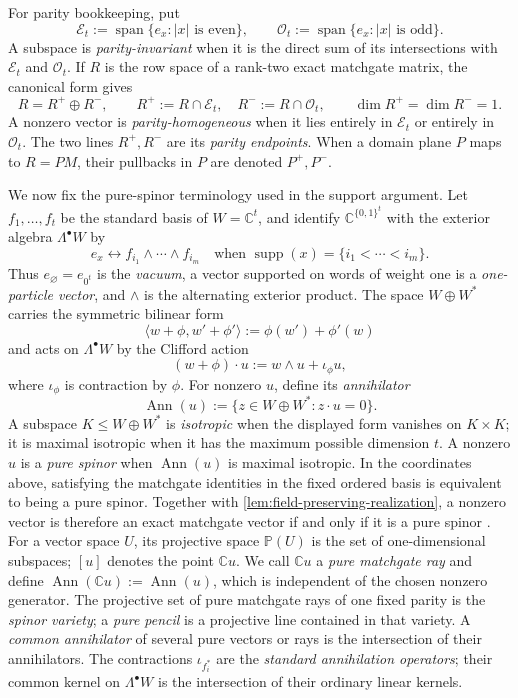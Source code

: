 \documentclass[11pt]{article}
\theoremstyle{definition}
\theoremstyle{remark}
\newcommand{\C}{\mathbb C}
\newcommand{\bits}{\{0,1\}}
\newcommand{\supp}{\operatorname{supp}}
\newcommand{\Ann}{\operatorname{Ann}}
\newcommand{\Span}{\operatorname{span}}
\begin{document}
For parity bookkeeping, put
\[
  \mathcal E_t:=\Span\{e_x:|x|\text{ is even}\},\qquad
  \mathcal O_t:=\Span\{e_x:|x|\text{ is odd}\}.
\]
A subspace is \emph{parity-invariant} when it is the direct sum of its
intersections with $\mathcal E_t$ and $\mathcal O_t$.  If $R$ is the row
space of a rank-two exact matchgate matrix, the canonical form gives
\[
  R=R^+\oplus R^-,\qquad
  R^+:=R\cap\mathcal E_t,\quad R^-:=R\cap\mathcal O_t,\qquad
  \dim R^+=\dim R^-=1.
\]
A nonzero vector is \emph{parity-homogeneous} when it lies entirely in
$\mathcal E_t$ or entirely in $\mathcal O_t$.
The two lines $R^+,R^-$ are its \emph{parity endpoints}.  When a domain
plane $P$ maps to $R=PM$, their pullbacks in $P$ are denoted $P^+,P^-$.

We now fix the pure-spinor terminology used in the support argument.  Let
$f_1,\ldots,f_t$ be the standard basis of $W=\C^t$, and identify
$\C^{\bits^t}$ with the exterior algebra $\Lambda^\bullet W$ by
\[
  e_x\longleftrightarrow
  f_{i_1}\wedge\cdots\wedge f_{i_m}
  \quad\text{when }\supp(x)=\{i_1<\cdots<i_m\}.
\]
Thus $e_\varnothing=e_{0^t}$ is the \emph{vacuum}, a vector supported on
words of weight one is a \emph{one-particle vector}, and $\wedge$ is the
alternating exterior product.  The space $W\oplus W^*$ carries the
symmetric bilinear form
\[
  \langle w+\phi,w'+\phi'\rangle
  :=\phi(w')+\phi'(w)
\]
and acts on $\Lambda^\bullet W$ by the Clifford action
\[
  (w+\phi)\cdot u:=w\wedge u+\iota_\phi u,
\]
where $\iota_\phi$ is contraction by $\phi$.  For nonzero $u$, define its
\emph{annihilator}
\begin{equation}
  \Ann(u):=\{z\in W\oplus W^*:z\cdot u=0\}.
  \label{eq:pure-spinor-annihilator}
\end{equation}
A subspace $K\le W\oplus W^*$ is \emph{isotropic} when the displayed form
vanishes on $K\times K$; it is maximal isotropic when it has the maximum
  possible dimension $t$.  A nonzero $u$ is a \emph{pure spinor} when
$\Ann(u)$ is maximal isotropic.  In the coordinates above, satisfying the
matchgate identities in the fixed ordered basis is equivalent to being a
pure spinor.  Together with \cref{lem:field-preserving-realization}, a
nonzero vector is therefore an exact matchgate vector if and only if it is
a pure spinor
\cite{CaiChoudharyLu2009,CaiGorenstein2014,Manivel2009}.  For a vector space
$U$, its projective space $\mathbb P(U)$ is the
set of one-dimensional subspaces; $[u]$ denotes the point $\C u$.  We call
$\C u$ a \emph{pure matchgate ray} and define
$\Ann(\C u):=\Ann(u)$, which is independent of the chosen nonzero generator.
The projective set of pure matchgate rays of one fixed parity is the
\emph{spinor variety}; a \emph{pure pencil} is a projective line contained
in that variety.  A \emph{common annihilator} of several pure vectors or
rays is the intersection of their annihilators.  The contractions
$\iota_{f_i^*}$ are the \emph{standard annihilation operators}; their common
kernel on $\Lambda^\bullet W$ is the intersection of their ordinary linear
kernels.
\end{document}
